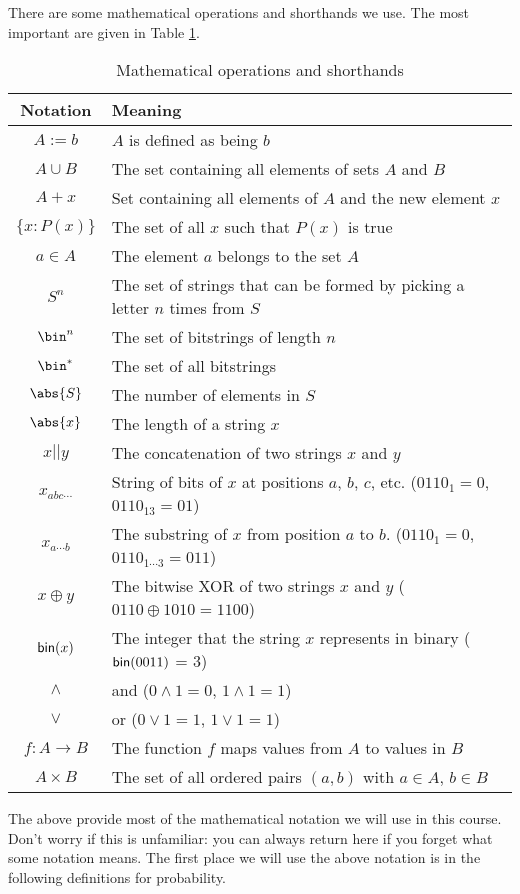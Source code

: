 There are some mathematical operations and shorthands we use. The most important are given in Table \ref{table:math}.
\begin{table}
\begin{tabular}{c | l}
Notation & Meaning \\ \hline
$A := b$ & $A$ is defined as being $b$ \\
$A \cup B$ & The set containing all elements of sets $A$ and $B$ \\
$A + x$ & Set containing all elements of $A$ and the new element $x$ \\
$\{x : P(x)\}$ & The set of all $x$ such that $P(x)$ is true \\
$a \in A$ & The element $a$ belongs to the set $A$ \\
$S^n$ & The set of strings that can be formed by picking a letter $n$ times from $S$ \\
$\bin^n$ & The set of bitstrings of length $n$ \\
$\bin^*$ & The set of all bitstrings \\
$\abs{S}$ & The number of elements in $S$ \\
$\abs{x}$ & The length of a string $x$ \\
$x||y$ & The concatenation of two strings $x$ and $y$ \\
$x_{abc\cdots}$ & String of bits of $x$ at positions $a$, $b$, $c$, etc. ($0110_1 = 0$, $0110_{13}=01$) \\
$x_{a \cdots b}$ & The substring of $x$ from position $a$ to $b$. ($0110_1 = 0$, $0110_{1 \cdots 3}=011$) \\
$x\oplus y$ & The bitwise XOR of two strings $x$ and $y$ ($0110 \oplus 1010 = 1100$) \\
$\textsf{bin}(x)$ & The integer that the string $x$ represents in binary ($\textsf{bin}(0011)$ = 3) \\ 
$\wedge$ & and ($0 \wedge 1 = 0$, $1 \wedge 1 = 1$) \\
$\vee$ & or ($0 \vee 1 = 1$, $1 \vee 1 = 1$)\\
$f: A \to B$ & The function $f$ maps values from $A$ to values in $B$\\
$A \times B$ & The set of all ordered pairs $(a,b)$ with $a \in A$, $b \in B$\\
\end{tabular}
\caption{Mathematical operations and shorthands}\label{table:math}
\end{table}

The above provide most of the mathematical notation we will use in this course. Don't worry if this is unfamiliar: you can always return here if you forget what some notation means. The first place we will use the above notation is in the following definitions for probability.

